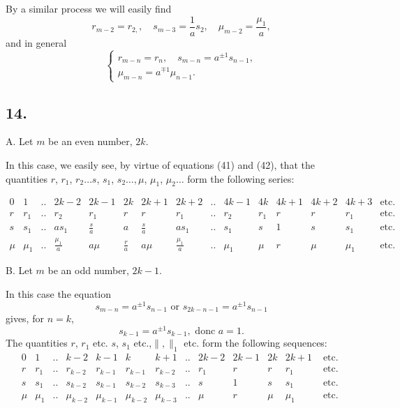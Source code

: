 \documentclass[oneside, 12 pt, leqno]{memoir}
\begin{document}
By a similar process we will easily find
\[r_{m-2}=r_{2,}, \quad s_{m-3}=\frac{1}{a} s_2, \quad \mu_{m-2}=\frac{\mu_1}{a},\]
and in general
\[\tag{42}\left\{\begin{array}{l}r_{m-n}=r_n, \quad s_{m-n}=a^{ \pm 1} s_{n-1}, \\
\mu_{m-n}=a^{\mp 1} \mu_{n-1}.\end{array}\right.\]

\subsection*{14.}

\begin{center}A. Let \(m\) be an even number, \(2k\).\end{center}
In this case, we easily see, by virtue of equations (41) and (42), that the quantities $r$, $r_1$, $r_2 \dots s$, $s_1$, $s_2 \dots, \mu$, $\mu_1$, $\mu_2 \dots$ form the following series:

{\setlength\arraycolsep{0.25em}\[\begin{array}{cccccccccccc|ccc}
0&1&..&2k-2&2k-1&2k&2k+1&2k+2&..&4k-1&4k&4k+1&4k+2&4k+3&\text{etc.}\\
r&r_1&..&r_2&r_1&r&r&r_1&..&r_2&r_1&r&r&r_1&\text{etc.}\\
s&s_1&..&as_1&\frac{s}{a}&a&\frac{s}{a}&as_1&..&s_1&s&1&s&s_1&\text{etc.}\\
\mu&\mu_1&..&\frac{\mu_1}{a}&a \mu & \frac{r}{a}&a\mu& \frac{\mu_1}{a}&..&\mu_1&\mu&r&\mu&\mu_1&\text{etc.}
\end{array}\]}

\begin{center}B. Let \(m\) be an odd number, \(2k-1\).\end{center}
In this case the equation
\[s_{m-n}=a^{ \pm 1} s_{n-1} \text { or } s_{2 k-n-1}=a^{ \pm 1} s_{n-1}\]
gives, for \(n=k\),
\[s_{k-1}=a^{ \pm 1} s_{k-1}, \text { donc } a=1.\]
The quantities \(r\), \(r_1\) etc. \(s\), \(s_1\) etc.,\(\|,\|_1\) etc. form the following sequences:
\[\begin{array}{cccccccccc|ccc}
0 & 1 & .. & k-2 & k-1 & k & k+1 & .. & 2 k-2 & 2 k-1 & 2 k & 2 k+1 & \text { etc. } \\
r & r_1 & .. & r_{k-2} & r_{k-1} & r_{k-1} & r_{k-2} & .. & r_1 & r & r & r_1 & \text { etc. } \\
s & s_1 & .. & s_{k-2} & s_{k-1} & s_{k-2} & s_{k-3} & .. & s & 1 & s & s_1 & \text { etc. } \\
\mu & \mu_1 & .. & \mu_{k-2} & \mu_{k-1} & \mu_{k-2} & \mu_{k-3} & .. & \mu & r & \mu & \mu_1 & \text { etc. }
\end{array}\]
\end{document}
